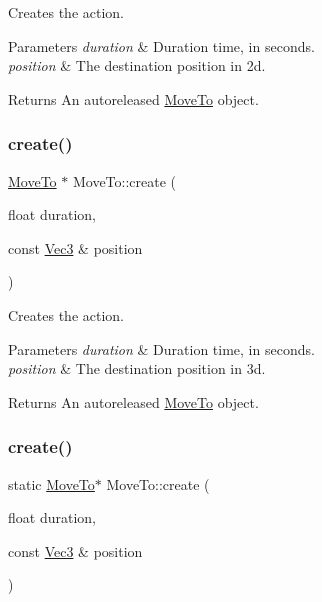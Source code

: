 Creates the action. 
\begin{DoxyParams}{Parameters}
{\em duration} & Duration time, in seconds. \\
\hline
{\em position} & The destination position in 2d. \\
\hline
\end{DoxyParams}
\begin{DoxyReturn}{Returns}
An autoreleased \hyperlink{classMoveTo}{Move\+To} object. 
\end{DoxyReturn}
\mbox{\label{classMoveTo_ae0e1c3414f367a02099be761f460ebec}} 
\subsubsection{\texorpdfstring{create()}{create()}\hspace{0.1cm}{\footnotesize\ttfamily [3/4]}}
{\footnotesize\ttfamily \hyperlink{classMoveTo}{Move\+To} $\ast$ Move\+To\+::create (\begin{DoxyParamCaption}\item[{float}]{duration,  }\item[{const \hyperlink{classVec3}{Vec3} \&}]{position }\end{DoxyParamCaption})\hspace{0.3cm}{\ttfamily [static]}}

Creates the action. 
\begin{DoxyParams}{Parameters}
{\em duration} & Duration time, in seconds. \\
\hline
{\em position} & The destination position in 3d. \\
\hline
\end{DoxyParams}
\begin{DoxyReturn}{Returns}
An autoreleased \hyperlink{classMoveTo}{Move\+To} object. 
\end{DoxyReturn}
\mbox{\label{classMoveTo_a50998e681b1f896e8e332effadd44194}} 
\subsubsection{\texorpdfstring{create()}{create()}\hspace{0.1cm}{\footnotesize\ttfamily [4/4]}}
{\footnotesize\ttfamily static \hyperlink{classMoveTo}{Move\+To}$\ast$ Move\+To\+::create (\begin{DoxyParamCaption}\item[{float}]{duration,  }\item[{const \hyperlink{classVec3}{Vec3} \&}]{position }\end{DoxyParamCaption})\hspace{0.3cm}{\ttfamily [static]}}

